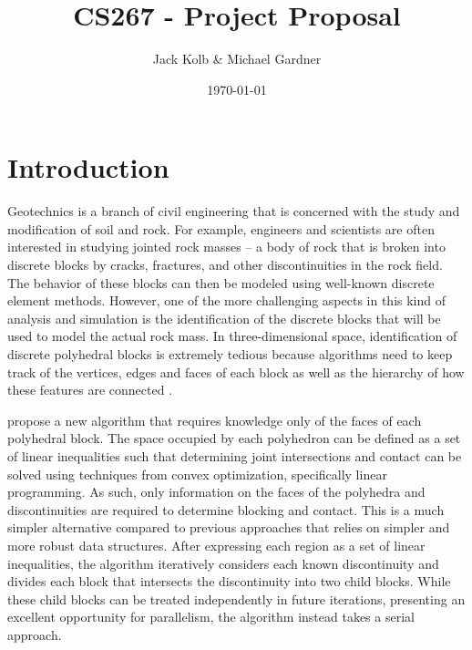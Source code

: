 \documentclass[american]{article}
\begin{document}
\title{\vspace{-3em}CS267 - Project Proposal}
\author{Jack Kolb \& Michael Gardner}
\date{\today}
\maketitle
\vspace{-4em}

\section{Introduction}
Geotechnics is a branch of civil engineering that is concerned with the study and modification of soil and rock. For example, engineers and scientists are often interested in studying jointed rock masses -- a body of rock that is broken into discrete blocks by cracks, fractures, and other discontinuities in the rock field. The behavior of these blocks can then be modeled using well-known discrete element methods. However, one of the more challenging aspects in this kind of analysis and simulation is the identification of the discrete blocks that will be used to model the actual rock mass. In three-dimensional space, identification of discrete polyhedral blocks is extremely tedious because algorithms need to keep track of the vertices, edges and faces of each block as well as the hierarchy of how these features are connected \parencite{Slicing}.

\textcite{Collision} propose a new algorithm that requires knowledge only of the faces of each polyhedral block. The space occupied by each polyhedron can be defined as a set of linear inequalities such that determining joint intersections and contact can be solved using techniques from convex optimization, specifically linear programming. As such, only information on the faces of the polyhedra and discontinuities are required to determine blocking and contact. This is a much simpler alternative compared to previous approaches that relies on simpler and more robust data structures. After expressing each region as a set of linear inequalities, the algorithm iteratively considers each known discontinuity and divides each block that intersects the discontinuity into two child blocks. While these child blocks can be treated independently in future iterations, presenting an excellent opportunity for parallelism, the algorithm instead takes a serial approach.
\end{document}
